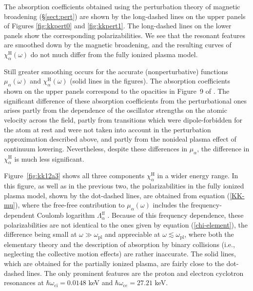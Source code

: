 \documentclass{emulateapj}
\newcommand{\req}[1]{equation (\ref{#1})}
\newcommand{\chiH}{\chi^\mathrm{H}}
\newcommand{\omc}{\omega_{\mathrm{c}e}} %
\newcommand{\omci}{\omega_{\mathrm{ci}}} %
\newcommand{\ompl}{\omega_\mathrm{pl}} %
\begin{document}
The absorption coefficients obtained using the perturbation 
theory of magnetic broadening (\S\ref{sect:pert})
are shown by the long-dashed lines
on the upper panels of Figures \ref{fig:kkpert0} and \ref{fig:kkpert1}.
The long-dashed lines on the lower panels show the corresponding
polarizabilities. We see that the resonant features are smoothed down
by the magnetic broadening, and the resulting curves of $\chiH_\alpha(\omega)$
do not much differ from the fully ionized plasma model.

Still greater smoothing occurs for the accurate (nonperturbative)
functions $\mu_\alpha(\omega)$ and $\chiH_\alpha(\omega)$ 
(solid lines in the figures). 
The absorption coefficients shown on the upper panels correspond to
the opacities in Figure~9 of \citet{PC03}. The significant difference of
these absorption coefficients from the perturbational ones
arises partly from the dependence of the oscillator strengths
on the atomic velocity across the field, partly from 
transitions which were dipole-forbidden
for the atom at rest and were not taken into account 
in the perturbation approximation described above,
and partly from the nonideal plasma effect of continuum
lowering. Nevertheless, despite these differences 
in $\mu_\alpha$, the difference in $\chiH_\alpha$ is much less significant.

Figure~\ref{fig:kk12a3} shows all three
components $\chiH_\alpha$ in a wider energy range.
In this figure, as well as in the previous two, the polarizabilities in the
fully ionized plasma model, shown by the dot-dashed lines,
 are obtained from \req{KK-mu},
where the free-free contribution to $\mu_\alpha(\omega)$ includes
the frequency-dependent Coulomb logarithm $\Lambda_\alpha^\mathrm{ff}$
\citep{PC03}. Because of this frequency dependence,
these polarizabilities are not identical to the ones given by
\req{chi-element}, the difference being small at $\omega\gg\ompl$
and appreciable at $\omega\lesssim\ompl$, where both the elementary theory
and the description of absorption by binary collisions (i.e., 
neglecting the collective motion effects) 
are rather inaccurate.
The solid lines, which are obtained for the partially ionized plasma,
are fairly close to the dot-dashed lines. The only prominent
features are the proton and electron cyclotron resonances
at $\hbar\omci=0.0148$ keV and $\hbar\omc=27.21$ keV.
\end{document}
